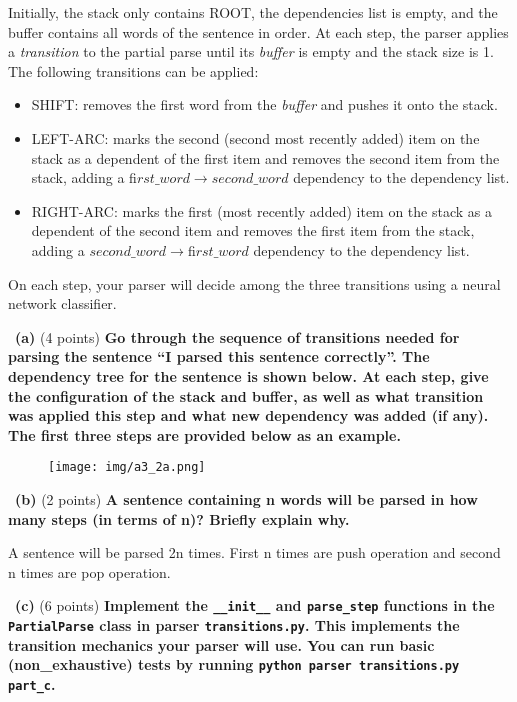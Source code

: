 \documentclass[a4 paper]{article}
\newcommand{\subproblem}[1]{~\newline\textbf{(#1)}}
\begin{document}
Initially, the stack only contains ROOT, the dependencies list is empty, and the buﬀer contains all words of the sentence in order.
At each step, the parser applies a \textit{transition} to the partial parse until its \textit{buffer} is empty and the stack size is 1.
The following transitions can be applied:

\begin{itemize}
    \item SHIFT: removes the ﬁrst word from the \textit{buffer} and pushes it onto the stack.
    \item LEFT-ARC: marks the second (second most recently added) item on the stack as a dependent of the ﬁrst item and removes the second item from the stack, adding a  $ﬁrst\_word\rightarrow second\_word$  dependency to the dependency list.
    \item RIGHT-ARC: marks the ﬁrst (most recently added) item on the stack as a dependent of the second item and removes the ﬁrst item from the stack, adding a $second\_word\rightarrow ﬁrst\_word $ dependency to the dependency list.
\end{itemize}

On each step, your parser will decide among the three transitions using a neural network classiﬁer.

\subproblem{a} (4 points) \textbf{Go through the sequence of transitions needed for parsing the sentence “I parsed this sentence correctly”.
The dependency tree for the sentence is shown below.
At each step, give the conﬁguration of the stack and buﬀer, as well as what transition was applied this step and what new dependency was added (if any).
The ﬁrst three steps are provided below as an example.}
\begin{figure}[h]
    \begin{center}
    \texttt{[image: img/a3\_2a.png]}
    \label{fig:a3_2a}
    \end{center}
\end{figure}


\subproblem{b} (2 points) \textbf{A sentence containing n words will be parsed in how many steps (in terms of n)? Brieﬂy explain why.} 

A sentence will be parsed 2n times.
First n times are push operation and second n times are pop operation.

\subproblem{c} (6 points) \textbf{Implement the \texttt{\_\_init\_\_} and \texttt{parse\_step} functions in the \texttt{PartialParse} class in parser \texttt{transitions.py}. This implements the transition mechanics your parser will use. You can run basic (non\_exhaustive) tests by running \texttt{python parser transitions.py part\_c}.}
\end{document}
